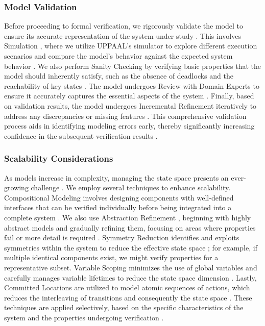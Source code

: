 \subsubsection{Model Validation}
Before proceeding to formal verification, we rigorously validate the model to ensure its accurate representation of the system under study \cite{baier2008principles,binder2000testing}. This involves  Simulation , where we utilize UPPAAL's simulator to explore different execution scenarios and compare the model's behavior against the expected system behavior \cite{larsen1997uppaal,david2015uppaal}. We also perform  Sanity Checking  by verifying basic properties that the model should inherently satisfy, such as the absence of deadlocks and the reachability of key states \cite{clarke2018handbook,david2015uppaal}. The model undergoes  Review with Domain Experts  to ensure it accurately captures the essential aspects of the system \cite{woodcock2009formal,broy2010seamless}. Finally, based on validation results, the model undergoes  Incremental Refinement  iteratively to address any discrepancies or missing features \cite{back1990refinement,broy2010seamless}. This comprehensive validation process aids in identifying modeling errors early, thereby significantly increasing confidence in the subsequent verification results \cite{binder2000testing,woodcock2009formal}.

\subsubsection{Scalability Considerations}
As models increase in complexity, managing the state space presents an ever-growing challenge \cite{bryant1986graph,clarke2018handbook}. We employ several techniques to enhance scalability.  Compositional Modeling  involves designing components with well-defined interfaces that can be verified individually before being integrated into a complete system \cite{baier2008principles,hoare1978communicating}. We also use  Abstraction Refinement , beginning with highly abstract models and gradually refining them, focusing on areas where properties fail or more detail is required \cite{clarke2007abstraction,back1990refinement}.  Symmetry Reduction  identifies and exploits symmetries within the system to reduce the effective state space \cite{clarke2018handbook,baier2008principles}; for example, if multiple identical components exist, we might verify properties for a representative subset.  Variable Scoping  minimizes the use of global variables and carefully manages variable lifetimes to reduce the state space dimension \cite{bryant1986graph,mcmillan1993model}. Lastly,  Committed Locations  are utilized to model atomic sequences of actions, which reduces the interleaving of transitions and consequently the state space \cite{larsen1997uppaal,bengtsson2003timed}. These techniques are applied selectively, based on the specific characteristics of the system and the properties undergoing verification \cite{clarke2018handbook,baier2008principles}.

